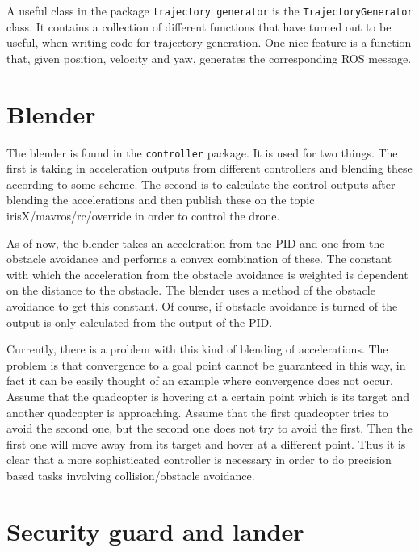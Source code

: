 \documentclass[titlepage,11pt,a4paper]{article}
\begin{document}
A useful class in the package \texttt{trajectory\textunderscore
  generator} is the \texttt{TrajectoryGenerator} class. It contains a
collection of different functions that have turned out to be useful,
when writing code for trajectory generation. One nice feature is a
function that, given position, velocity and yaw, generates the
corresponding ROS message.


\section{Blender}
\label{sec:blender}

The blender is found in the \texttt{controller} package. It is used
for two things. The first is taking in acceleration outputs from
different controllers and blending these according to some scheme. The
second is to calculate the control outputs after blending the
accelerations and then publish these on the topic
irisX/mavros/rc/override in order to control the drone.

As of now, the blender takes an acceleration from the PID and one from
the obstacle avoidance and performs a convex combination of these. The
constant with which the acceleration from the obstacle avoidance is
weighted is dependent on the distance to the obstacle. The blender
uses a method of the obstacle avoidance to get this constant. Of
course, if obstacle avoidance is turned of the output is only
calculated from the output of the PID.

Currently, there is a problem with this kind of blending of
accelerations. The problem is that convergence to a goal point cannot
be guaranteed in this way, in fact it can be easily thought of an
example where convergence does not occur. Assume that the quadcopter
is hovering at a certain point which is its target and another
quadcopter is approaching. Assume that the first quadcopter tries to
avoid the second one, but the second one does not try to avoid the
first. Then the first one will move away from its target and hover at
a different point. Thus it is clear that a more sophisticated
controller is necessary in order to do precision based tasks involving
collision/obstacle avoidance.


\section{Security guard and lander}
\label{sec:security_guard}
\end{document}
